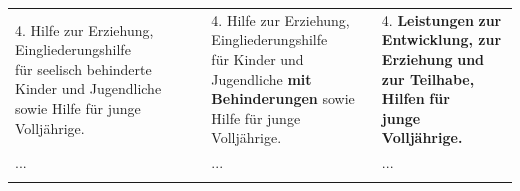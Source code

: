 \documentclass[10pt,a4paper,landscape]{article}
\begin{document}
\begin{longtable}{|L{8.2cm}|L{8.2cm}|L{8.2cm}|}
4. \textcolor{diffred}{Hilfe} zur \textcolor{diffred}{Erziehung, Eingliederungshilfe  \newline für seelisch behinderte Kinder} und  \newline \textcolor{diffred}{Jugendliche sowie Hilfe} für junge  \newline Volljährige. & 4. \textcolor{diffred}{Hilfe} zur \textcolor{diffred}{Erziehung, Eingliederungshilfe  \newline für  Kinder} und  \newline \textcolor{diffred}{Jugendliche }\textbf{\textcolor{diffred}{mit Behinderungen}}\textcolor{diffred}{ sowie  \newline Hilfe} für junge Volljährige. & 4. \textbf{\textcolor{diffgreen}{Leistungen}}\textbf{ zur }\textbf{\textcolor{diffgreen}{Entwicklung, zur  \newline Erziehung}}\textbf{ und }\textbf{\textcolor{diffgreen}{zur Teilhabe, Hilfen}}\textbf{ für  \newline junge Volljährige.} \\
\hhline{|---|}
... & ... & ... \\
\hhline{|---|}
\end{longtable}
\newpage
\end{document}
